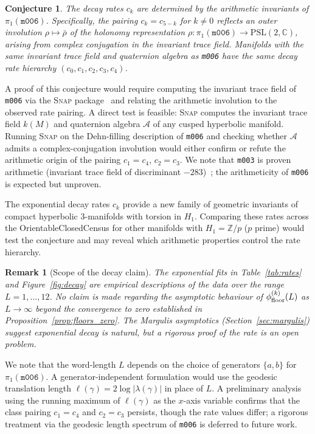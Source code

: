 \documentclass[12pt,a4paper]{article}
\newcommand{\PSL}{\mathrm{PSL}(2,\mathbb{C})}
\newcommand{\mfld}[1]{\texttt{#1}}
\newtheorem{conjecture}{Conjecture}
\newtheorem{remark}{Remark}
\begin{document}
\begin{conjecture}
The decay rates $c_k$ are determined by the arithmetic invariants of
$\pi_1(\mfld{m006})$.
Specifically, the pairing $c_k=c_{5-k}$ for $k\neq 0$ reflects an
outer involution $\rho\mapsto\bar{\rho}$ of the holonomy representation
$\rho:\pi_1(\mfld{m006})\to\PSL$, arising from complex conjugation in
the invariant trace field.
Manifolds with the same invariant trace field and quaternion algebra as
\mfld{m006} have the same decay rate hierarchy $(c_0,c_1,c_2,c_3,c_4)$.
\end{conjecture}

A proof of this conjecture would require computing the invariant trace
field of \mfld{m006} via the \textsc{Snap} package~\cite{Snap} and
relating the arithmetic involution to the observed rate pairing.
A direct test is feasible: \textsc{Snap} computes the invariant trace
field $k(M)$ and quaternion algebra $\mathcal{A}$ of any cusped
hyperbolic manifold.  Running \textsc{Snap} on the Dehn-filling
description of \mfld{m006} and checking whether $\mathcal{A}$ admits
a complex-conjugation involution would either confirm or refute the
arithmetic origin of the pairing $c_1=c_4$, $c_2=c_3$.
We note that \mfld{m003} is proven arithmetic (invariant trace field of
discriminant $-283$)~\cite{Chinburg98}; the arithmeticity of \mfld{m006}
is expected but unproven.

The exponential decay rates $c_k$ provide a new family of geometric
invariants of compact hyperbolic 3-manifolds with torsion in $H_1$.
Comparing these rates across the OrientableClosedCensus for other manifolds
with $H_1=\mathbb{Z}/p$ ($p$ prime) would test the conjecture and may
reveal which arithmetic properties control the rate hierarchy.

\begin{remark}[Scope of the decay claim]
The exponential fits in Table~\ref{tab:rates} and Figure~\ref{fig:decay}
are empirical descriptions of the data over the range $L=1,\ldots,12$.
No claim is made regarding the asymptotic behaviour of
$\phi_{\rm floor}^{(k)}(L)$ as $L\to\infty$ beyond the convergence to
zero established in Proposition~\ref{prop:floors_zero}.
The Margulis asymptotics (Section~\ref{sec:margulis}) suggest exponential
decay is natural, but a rigorous proof of the rate is an open problem.
\end{remark}

We note that the word-length $L$ depends on the choice of generators
$\{a,b\}$ for $\pi_1(\mfld{m006})$.  A generator-independent formulation
would use the geodesic translation length $\ell(\gamma)=2\log|\lambda(\gamma)|$
in place of $L$.  A preliminary analysis using the running maximum of
$\ell(\gamma)$ as the $x$-axis variable confirms that the class pairing
$c_1=c_4$ and $c_2=c_3$ persists, though the rate values differ;
a rigorous treatment via the geodesic length spectrum of \mfld{m006}
is deferred to future work.
\end{document}
